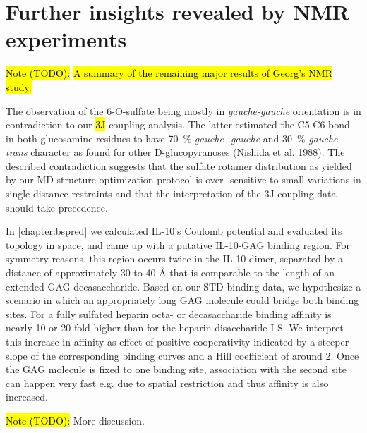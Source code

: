 
\section{Further insights revealed by NMR experiments}
\label{nmr:further_insights}
\hl{Note (TODO):}
\hl{A summary of the remaining major results of Georg's NMR study.}


The observation of the 6-O-sulfate being mostly in \textit
{gauche-gauche} orientation is in contradiction to our \hl{3J} coupling
analysis. The latter estimated the C5-C6 bond in both glucosamine residues to
have \SI{70}{\percent} \textit{gauche- gauche} and \SI{30}{\percent} \textit
{gauche-trans} character as found for other D-glucopyranoses (Nishida et al.
1988). The described contradiction suggests that the sulfate rotamer
distribution as yielded by our MD structure optimization protocol is over-
sensitive to small variations in single distance restraints and that the
interpretation of the 3J coupling data should take precedence.



In \cref{chapter:bspred} we calculated IL-10's Coulomb potential and evaluated
its topology in space, and came up with a putative IL-10-GAG binding region. For
symmetry reasons, this region occurs twice in the IL-10 dimer, separated by a
distance of approximately 30 to 40 Å that is comparable to the length of an
extended GAG decasaccharide. Based on our STD binding data, we hypothesize a
scenario in which an appropriately long GAG molecule could bridge both binding
sites. For a fully sulfated heparin octa- or decasaccharide binding affinity is
nearly 10 or 20-fold higher than for the heparin disaccharide I-S. We interpret
this increase in affinity as effect of positive cooperativity indicated by a
steeper slope of the corresponding binding curves and a Hill coefficient of
around 2. Once the GAG molecule is fixed to one binding site, association with
the second site can happen very fast e.g. due to spatial restriction and thus
affinity is also increased.

\hl{Note (TODO):}
More discussion.

